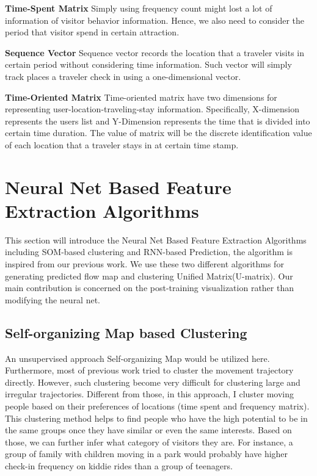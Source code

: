 \documentclass[runningheads,a4paper]{llncs}
\begin{document}
\textbf{Time-Spent Matrix} Simply using frequency count might lost a lot of information of visitor behavior information. Hence, we also need to consider the period that visitor spend in certain attraction.

\textbf{Sequence Vector} Sequence vector records the location that a traveler visits in certain period without considering time information. Such vector will simply track places a traveler check in using a one-dimensional vector.

\textbf{Time-Oriented Matrix} Time-oriented matrix have two dimensions for representing user-location-traveling-stay information. Specifically, X-dimension represents the users list and Y-Dimension represents the time that is divided into certain time duration. The value of matrix will be the discrete identification value of each location that a traveler stays in at certain time stamp. 

\section{Neural Net Based Feature Extraction Algorithms}
 This section will introduce the Neural Net Based Feature Extraction Algorithms including SOM-based clustering and RNN-based Prediction, the algorithm is inspired from our previous work\cite{cnn}. We use these two different algorithms for generating predicted flow map and clustering Unified Matrix(U-matrix). Our main contribution is concerned on the post-training visualization rather than modifying the neural net.

\subsection{Self-organizing Map based Clustering}
An unsupervised approach Self-organizing Map would be utilized here. Furthermore, most of previous work tried to cluster the movement trajectory directly. However, such clustering become very difficult for clustering large and irregular trajectories. Different from those, in this approach, I cluster moving people based on their preferences of locations (time spent and frequency matrix). This clustering method helps to find people who have the high potential to be in the same groups once they have similar or even the same interests. Based on those, we can further infer what category of visitors they are. For instance, a group of family with children moving in a park would probably have higher check-in frequency on kiddie rides than a group of teenagers.
\end{document}
